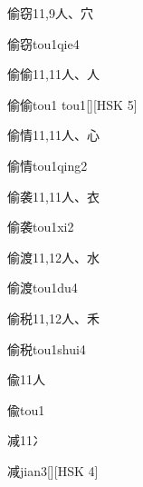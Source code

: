 \begin{entry}{偷窃}{11,9}{⼈、⽳}
  \begin{phonetics}{偷窃}{tou1qie4}
  \end{phonetics}
\end{entry}

\begin{entry}{偷偷}{11,11}{⼈、⼈}
  \begin{phonetics}{偷偷}{tou1 tou1}[][HSK 5]
  \end{phonetics}
\end{entry}

\begin{entry}{偷情}{11,11}{⼈、⼼}
  \begin{phonetics}{偷情}{tou1qing2}
  \end{phonetics}
\end{entry}

\begin{entry}{偷袭}{11,11}{⼈、⾐}
  \begin{phonetics}{偷袭}{tou1xi2}
  \end{phonetics}
\end{entry}

\begin{entry}{偷渡}{11,12}{⼈、⽔}
  \begin{phonetics}{偷渡}{tou1du4}
  \end{phonetics}
\end{entry}

\begin{entry}{偷税}{11,12}{⼈、⽲}
  \begin{phonetics}{偷税}{tou1shui4}
  \end{phonetics}
\end{entry}

\begin{entry}{偸}{11}{⼈}
  \begin{phonetics}{偸}{tou1}
  \end{phonetics}
\end{entry}

\begin{entry}{减}{11}{⼎}
  \begin{phonetics}{减}{jian3}[][HSK 4]
  \end{phonetics}
\end{entry}

